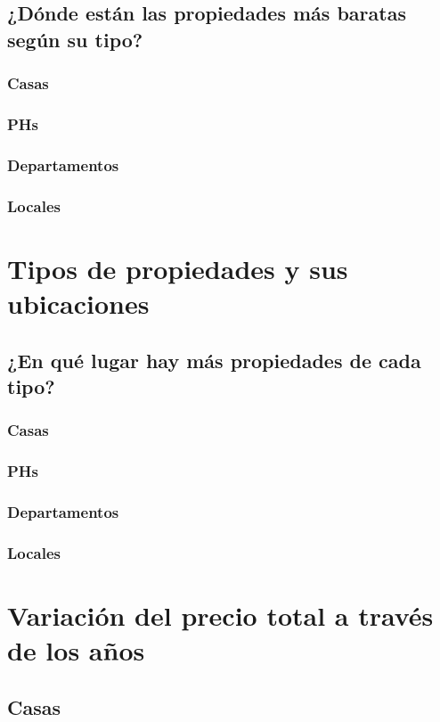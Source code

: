 \documentclass[a4paper, 10pt]{article}
\begin{document}
			\subsection{¿Dónde están las propiedades más baratas según su tipo?}
				\subsubsection{Casas}
				\subsubsection{PHs}
				\subsubsection{Departamentos}
				\subsubsection{Locales}
		\section{Tipos de propiedades y sus ubicaciones}
			\subsection{¿En qué lugar hay más propiedades de cada tipo?}
				\subsubsection{Casas}
				\subsubsection{PHs}
				\subsubsection{Departamentos}
				\subsubsection{Locales}
		\section{Variación del precio total a través de los años}
			\subsection{Casas}
\end{document}
